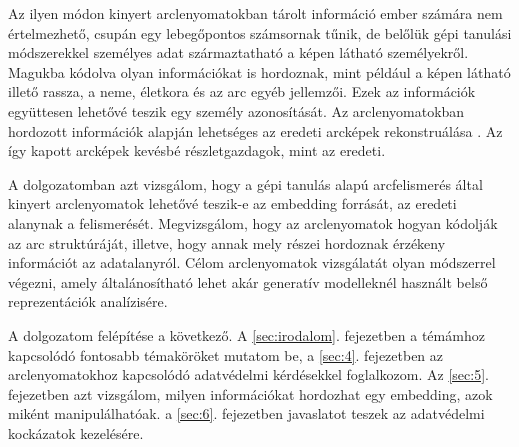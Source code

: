 
Az ilyen módon kinyert arclenyomatokban tárolt információ ember számára nem értelmezhető, csupán egy lebegőpontos számsornak tűnik, de belőlük gépi tanulási módszerekkel személyes adat származtatható a képen látható személyekről. Magukba kódolva olyan információkat is hordoznak, mint például a képen látható illető rassza, a neme, életkora és az arc egyéb jellemzői. Ezek az információk együttesen lehetővé teszik egy személy azonosítását. Az arclenyomatokban hordozott információk alapján lehetséges az eredeti arcképek rekonstruálása \cite{mai2018reconstruction}. Az így kapott arcképek kevésbé részletgazdagok, mint az eredeti.





A dolgozatomban azt vizsgálom, hogy a gépi tanulás alapú arcfelismerés által kinyert arclenyomatok lehetővé teszik-e az embedding forrását, az eredeti alanynak a felismerését. Megvizsgálom, hogy az arclenyomatok hogyan kódolják az arc struktúráját, illetve, hogy annak mely részei hordoznak érzékeny információt az adatalanyról. Célom arclenyomatok vizsgálatát olyan módszerrel végezni, amely általánosítható lehet akár generatív modelleknél használt belső reprezentációk analízisére.

A dolgozatom felépítése a következő. A \ref{sec:irodalom}. fejezetben a témámhoz kapcsolódó fontosabb témaköröket mutatom be, a \ref{sec:4}. fejezetben az arclenyomatokhoz kapcsolódó adatvédelmi kérdésekkel foglalkozom. Az \ref{sec:5}. fejezetben azt vizsgálom, milyen információkat hordozhat egy embedding, azok miként manipulálhatóak. a \ref{sec:6}. fejezetben javaslatot teszek az adatvédelmi kockázatok kezelésére.

